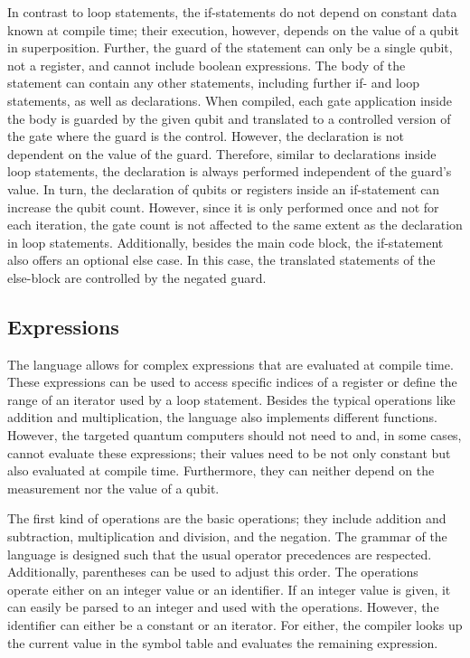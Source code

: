 In contrast to loop statements, the if-statements do not depend on constant data known at compile time; their execution, however, depends on the value of a qubit in superposition. Further, the guard of the statement can only be a single qubit, not a register, and cannot include boolean expressions.
The body of the statement can contain any other statements, including further if- and loop statements, as well as declarations. When compiled, each gate application inside the body is guarded by the given qubit and translated to a controlled version of the gate where the guard is the control. However, the declaration is not dependent on the value of the guard. Therefore, similar to declarations inside loop statements, the declaration is always performed independent of the guard's value. In turn, the declaration of qubits or registers inside an if-statement can increase the qubit count. However, since it is only performed once and not for each iteration, the gate count is not affected to the same extent as the declaration in loop statements. Additionally, besides the main code block, the if-statement also offers an optional else case. In this case, the translated statements of the else-block are controlled by the negated guard. 

\subsection{Expressions}
\label{sec:concept_expressions}
The language allows for complex expressions that are evaluated at compile time. These expressions can be used to access specific indices of a register or define the range of an iterator used by a loop statement. Besides the typical operations like addition and multiplication, the language also implements different functions. However, the targeted quantum computers should not need to and, in some cases, cannot evaluate these expressions; their values need to be not only constant but also evaluated at compile time. Furthermore, they can neither depend on the measurement nor the value of a qubit.

The first kind of operations are the basic operations; they include addition and subtraction, multiplication and division, and the negation. The grammar of the language is designed such that the usual operator precedences are respected. Additionally, parentheses can be used to adjust this order. The operations operate either on an integer value or an identifier. If an integer value is given, it can easily be parsed to an integer and used with the operations. However, the identifier can either be a constant or an iterator. For either, the compiler looks up the current value in the symbol table and evaluates the remaining expression. 

